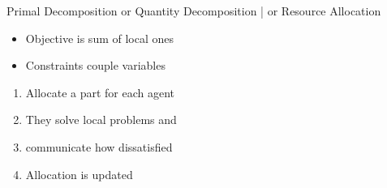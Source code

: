 \documentclass[aspectratio=169]{beamer}
\begin{document}
\begin{frame}{Primal Decomposition }{or Quantity Decomposition | or Resource Allocation}
  \begin{minipage}[c]{.45\linewidth}
    \begin{itemize}
      \item<2-> Objective is sum of local ones
      \item<3-> Constraints couple variables
    \end{itemize}
  \end{minipage}
  \hfill
  \begin{minipage}[c]{.45\linewidth}
  \end{minipage}

  \begin{minipage}[c]{.5\linewidth}
    \begin{enumerate}
      \item<5-> Allocate a part for each agent
      \item<6-> They solve local problems and
      \item<7-> communicate how dissatisfied
      \item<8-> Allocation is updated 
    \end{enumerate}
  \end{minipage}
  \hfill
  \begin{minipage}[c]{.45\linewidth}
  \end{minipage}
\end{frame}
\end{document}
